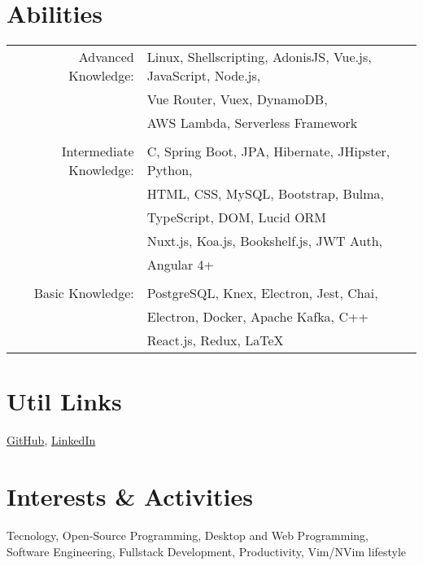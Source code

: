 \documentclass[a4paper,10pt]{article}
\begin{document}
\section{Abilities}
\begin{tabular}{rl}
 Advanced Knowledge:& Linux, Shellscripting, AdonisJS, Vue.js, JavaScript, Node.js,\\& Vue Router, Vuex, DynamoDB, \\& AWS Lambda, Serverless Framework\\\\
 Intermediate Knowledge:& \textsc{C}, Spring Boot, JPA, Hibernate, JHipster, Python, \\ &HTML, CSS, My\textsc{SQL}, Bootstrap, Bulma,\\& TypeScript, DOM, Lucid ORM\\& Nuxt.js, Koa.js, Bookshelf.js, JWT Auth,\\&Angular 4+\\\\
 Basic Knowledge: & PostgreSQL, Knex, Electron, Jest, Chai, \\  & Electron, Docker, Apache Kafka, C++\\
 &React.js, Redux, LaTeX
\end{tabular}

\section{Util Links}
\href{https://github.com/Lakshamana}{GitHub}, \href{https://www.linkedin.com/in/guilherme-albuquerque-622421127}{LinkedIn}\\

\section{Interests \& Activities}
Tecnology, Open-Source Programming, Desktop and Web Programming, \\Software Engineering, Fullstack Development, Productivity, Vim/NVim lifestyle

\end{document}
